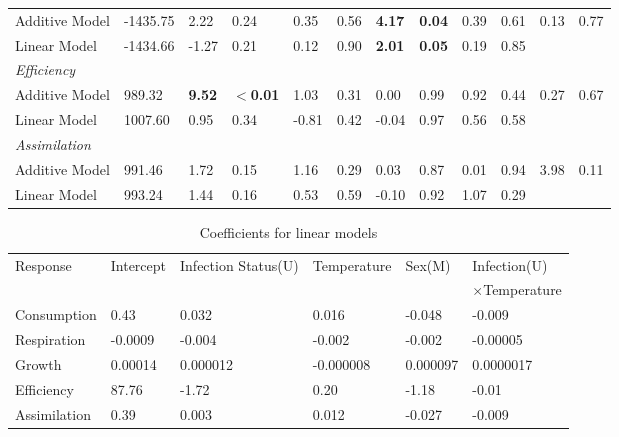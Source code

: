 \begin{landscape}
\begin{table}
\begin{tabular}{@{}llllllllllll@{}}
Additive Model & -1435.75 & 2.22 & 0.24 & 0.35 & 0.56 & \textbf{4.17} & \textbf{0.04} & 0.39 & 0.61 & 0.13 & 0.77 \\
Linear Model & -1434.66 & -1.27 & 0.21 & 0.12 & 0.90 & \textbf{2.01} & \textbf{0.05} & 0.19 & 0.85 &  &  \\
\textit{Efficiency} &  &  &  &  &  &  &  &  &  &  &  \\
Additive Model & 989.32 & \textbf{9.52} & \textbf{$<$0.01} & 1.03 & 0.31 & 0.00 & 0.99 & 0.92 & 0.44 & 0.27 & 0.67 \\
Linear Model & 1007.60 & 0.95 & 0.34 & -0.81 & 0.42 & -0.04 & 0.97 & 0.56 & 0.58 &  &  \\
\textit{Assimilation} &  &  &  &  &  &  &  &  &  &  &  \\
Additive Model & 991.46 & 1.72 & 0.15 & 1.16 & 0.29 & 0.03 & 0.87 & 0.01 & 0.94 & 3.98 & 0.11 \\
Linear Model & 993.24 & 1.44 & 0.16 & 0.53 & 0.59 & -0.10 & 0.92 & 1.07 & 0.29 &  &  \\ \bottomrule
\end{tabular}
\end{table}

\begin{table}%
\caption [Coefficients for linear models.]{Coefficients for linear models }
\centering
\begin{tabular}{@{}llllll@{}} \toprule
Response & Intercept & Infection Status(U) & Temperature & Sex(M) & Infection(U) \\
 & & & & &$\times$Temperature \\ \midrule
Consumption& 0.43&0.032&0.016&-0.048&-0.009\\
Respiration & -0.0009&-0.004&-0.002&-0.002&-0.00005\\
Growth & 0.00014&0.000012&-0.000008&0.000097&0.0000017\\
Efficiency&87.76&-1.72&0.20&-1.18&-0.01 \\
Assimilation& 0.39 &0.003&0.012&-0.027&-0.009\\ \bottomrule
\end{tabular}
\end{table}

\end{landscape}
%
%

